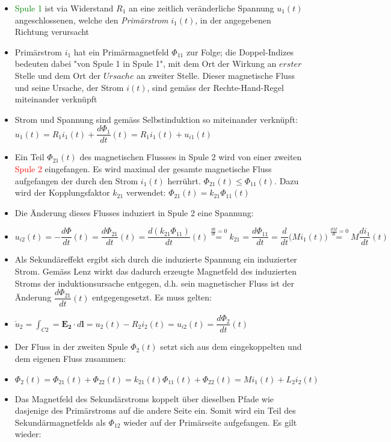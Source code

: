 \begin{itemize}
\item \textcolor{green}{Spule 1} ist via Widerstand $R_1$ an eine zeitlich veränderliche Spannung $u_1(t)$ angeschlossenen, welche den \textit{Primärstrom} $i_1(t)$, in der angegebenen Richtung verursacht
\item Primärstrom $i_1$ hat ein  Primärmagnetfeld  $\Phi_{11}$ zur Folge; die Doppel-Indizes bedeuten dabei "von Spule 1 in Spule 1", mit dem Ort der Wirkung an $erster$ Stelle und dem Ort der $Ursache$ an zweiter Stelle. Dieser magnetische Fluss und seine Ursache, der Strom $i(t)$, sind gemäss der Rechte-Hand-Regel miteinander verknüpft
\item Strom und Spannung sind gemäss Selbstinduktion so miteinander verknüpft: $u_1(t)=R_1i_1(t)+\dfrac{d\Phi_1}{dt}(t)=R_1i_1(t)+u_{i1}(t)$
\item Ein Teil $\Phi_{21}(t)$ des magnetischen Flussses in Spule 2 wird von einer zweiten \textcolor{red}{Spule 2} eingefangen. Es wird maximal der gesamte magnetische Fluss aufgefangen der durch den Strom $i_1(t)$ herrührt. $\Phi_{21}(t)\leq\Phi_{11}(t)$. Dazu wird der Kopplungsfaktor $k_{21}$ verwendet: $\Phi_{21}(t)=k_{21}\Phi_{11}(t)$
\item Die Änderung dieses Flusses induziert in Spule 2 eine Spannung:
\item[] $u_{i2}(t)=-\dfrac{d\Phi}{dt}(t)=\dfrac{d\Phi_{21}}{dt}(t)=\dfrac{d(k_{21}\Phi_{11})}{dt}(t)\overset{\frac{dk}{dt}=0}{=}k_{21}=\dfrac{d\Phi_{11}}{dt}=\dfrac{d}{dt}\big(Mi_1(t)\big)\overset{\frac{dM}{dt}=0}{=}M\dfrac{di_1}{dt}(t)$
\item Als Sekundäreffekt ergibt sich durch die induzierte Spannung ein induzierter Strom. Gemäss Lenz wirkt das dadurch erzeugte Magnetfeld des induzierten Stroms der induktionsursache entgegen, d.h. sein magnetischer Fluss ist der Änderung $\dfrac{d\Phi_{21}}{dt}(t)$ entgegengesetzt. Es muss gelten:
\item[] $\mathring{u}_2 = \displaystyle\int_{C2}=\mathbf{E_2}\cdot d\mathbf{l}=u_2(t)-R_2i_2(t)=u_{i2}(t)=\dfrac{d\Phi_{2}}{dt}(t)$
\item Der Fluss in der zweiten Spule $\Phi_{2}(t)$ setzt sich aus dem eingekoppelten und dem eigenen Fluss zusammen:
\item[] $\Phi_{2}(t)=\Phi_{21}(t)+\Phi_{22}(t)=k_{21}(t)\Phi_{11}(t)+\Phi_{22}(t)=Mi_1(t)+L_2i_2(t)$
\item Das Magnetfeld des Sekundärstroms koppelt über dieselben Pfade wie dasjenige des Primärstroms auf die andere Seite ein. Somit wird ein Teil des Sekundärmagnetfelds als $\Phi_{12}$ wieder auf der Primärseite aufgefangen. Es gilt wieder: 

\end{itemize}
